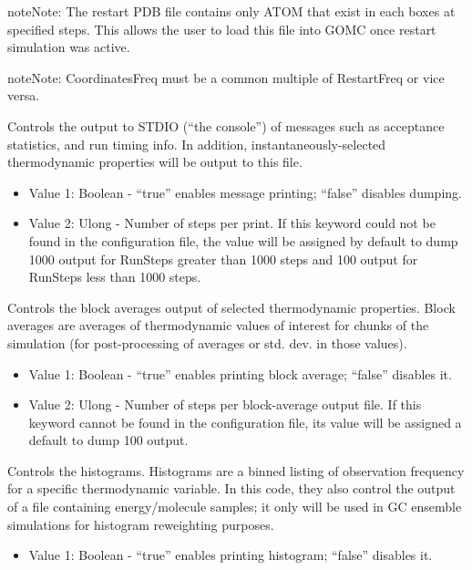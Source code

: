 \documentclass[letterpaper,10pt,english]{sphinxmanual}
\begin{document}
\begin{description}
\begin{itemize}
\end{itemize}

\begin{sphinxadmonition}{note}{Note:}
The restart PDB file contains only ATOM that exist in each boxes at specified steps. This allows the user to load this file into GOMC once restart simulation was active.
\end{sphinxadmonition}

\begin{sphinxadmonition}{note}{Note:}
CoordinatesFreq must be a common multiple of RestartFreq or vice versa.
\end{sphinxadmonition}

\item[{\sphinxcode{\sphinxupquote{ConsoleFreq}}}] \leavevmode
Controls the output to STDIO (“the console”) of messages such as acceptance statistics, and run timing info. In addition, instantaneously-selected thermodynamic properties will be output to this file.
\begin{itemize}
\item {} 
Value 1: Boolean - “true” enables message printing; “false” disables dumping.

\item {} 
Value 2: Ulong - Number of steps per print. If this keyword could not be found in the configuration file, the value will be assigned by default to dump 1000 output for RunSteps greater than 1000 steps and 100 output for RunSteps less than 1000 steps.

\end{itemize}

\item[{\sphinxcode{\sphinxupquote{BlockAverageFreq}}}] \leavevmode
Controls the block averages output of selected thermodynamic properties. Block averages are averages of thermodynamic values of interest for chunks of the simulation (for post-processing of averages or std. dev. in those values).
\begin{itemize}
\item {} 
Value 1: Boolean - “true” enables printing block average; “false” disables it.

\item {} 
Value 2: Ulong - Number of steps per block-average output file. If this keyword cannot be found in the configuration file, its value will be assigned a default to dump 100 output.

\end{itemize}

\item[{\sphinxcode{\sphinxupquote{HistogramFreq}}}] \leavevmode
Controls the histograms. Histograms are a binned listing of observation frequency for a specific thermodynamic variable. In this code, they also control the output of a file containing energy/molecule samples; it only will be used in GC ensemble simulations for histogram reweighting purposes.
\begin{itemize}
\item {} 
Value 1: Boolean - “true” enables printing histogram; “false” disables it.


\end{itemize}
\end{description}
\end{document}
